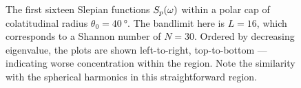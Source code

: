 \begin{figure}[htpb]
	\newline
	\hfill
	\hfill
	\hfill
	\caption[
		The Slepian functions within a \(\SI{40}{\degree}\) polar cap
	]{
		The first sixteen Slepian functions \({S}_{p}(\omega)\) within a polar cap of colatitudinal radius \(\theta_{0}=\SI{40}{\degree}\).
		The bandlimit here is  \(L=16\), which corresponds to a Shannon number of \(N=30\).
		Ordered by decreasing eigenvalue, the plots are shown left-to-right, top-to-bottom --- indicating worse concentration within the region.
		Note the similarity with the spherical harmonics in this straightforward region.
	}\label{fig:chapter2_slepian_polar_cap}
\end{figure}

